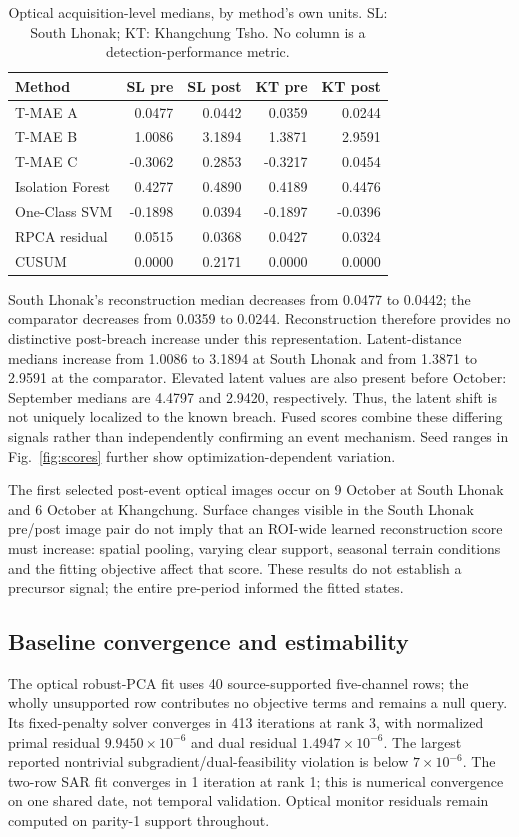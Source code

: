 \documentclass[10pt,twocolumn]{article}
\begin{document}
\begin{table}[t]\centering\scriptsize
\caption{Optical acquisition-level medians, by method's own units. SL: South Lhonak; KT: Khangchung Tsho. No column is a detection-performance metric.}\label{tab:contrasts}
\begin{tabular}{lrrrr}\toprule
Method & SL pre & SL post & KT pre & KT post\\\midrule
T-MAE A & 0.0477 & 0.0442 & 0.0359 & 0.0244\\
T-MAE B & 1.0086 & 3.1894 & 1.3871 & 2.9591\\
T-MAE C & -0.3062 & 0.2853 & -0.3217 & 0.0454\\
Isolation Forest & 0.4277 & 0.4890 & 0.4189 & 0.4476\\
One-Class SVM & -0.1898 & 0.0394 & -0.1897 & -0.0396\\
RPCA residual & 0.0515 & 0.0368 & 0.0427 & 0.0324\\
CUSUM & 0.0000 & 0.2171 & 0.0000 & 0.0000\\
\bottomrule\end{tabular}
\end{table}

South Lhonak's reconstruction median decreases from 0.0477 to 0.0442; the comparator decreases from 0.0359 to 0.0244. Reconstruction therefore provides no distinctive post-breach increase under this representation. Latent-distance medians increase from 1.0086 to 3.1894 at South Lhonak and from 1.3871 to 2.9591 at the comparator. Elevated latent values are also present before October: September medians are 4.4797 and 2.9420, respectively. Thus, the latent shift is not uniquely localized to the known breach. Fused scores combine these differing signals rather than independently confirming an event mechanism. Seed ranges in Fig.~\ref{fig:scores} further show optimization-dependent variation.

The first selected post-event optical images occur on 9 October at South Lhonak and 6 October at Khangchung. Surface changes visible in the South Lhonak pre/post image pair do not imply that an ROI-wide learned reconstruction score must increase: spatial pooling, varying clear support, seasonal terrain conditions and the fitting objective affect that score. These results do not establish a precursor signal; the entire pre-period informed the fitted states.

\subsection{Baseline convergence and estimability}
The optical robust-PCA fit uses 40 source-supported five-channel rows; the wholly unsupported row contributes no objective terms and remains a null query. Its fixed-penalty solver converges in 413 iterations at rank 3, with normalized primal residual $9.9450\times10^{-6}$ and dual residual $1.4947\times10^{-6}$. The largest reported nontrivial subgradient/dual-feasibility violation is below $7\times10^{-6}$. The two-row SAR fit converges in 1 iteration at rank 1; this is numerical convergence on one shared date, not temporal validation. Optical monitor residuals remain computed on parity-1 support throughout.
\end{document}
